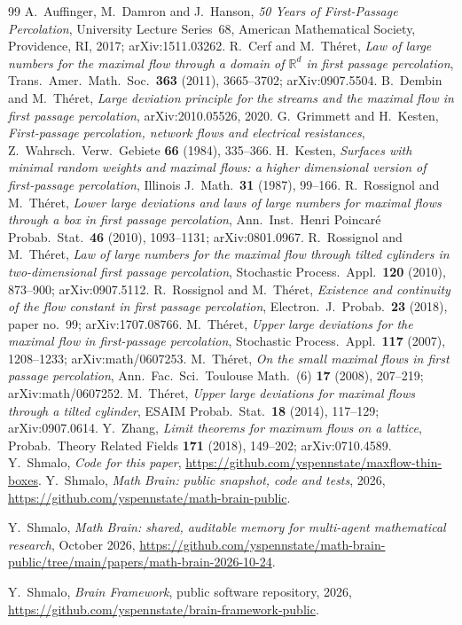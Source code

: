 \documentclass[11pt]{amsart}
\theoremstyle{definition}
\theoremstyle{remark}
\begin{document}
\begin{thebibliography}{99}
 A.~Auffinger, M.~Damron and J.~Hanson, \emph{50 Years of First-Passage Percolation}, University Lecture Series~68, American Mathematical Society, Providence, RI, 2017; arXiv:1511.03262.
 R.~Cerf and M.~Th\'eret, \emph{Law of large numbers for the maximal flow through a domain of $\mathbb{R}^d$ in first passage percolation}, Trans.\ Amer.\ Math.\ Soc.\ \textbf{363} (2011), 3665--3702; arXiv:0907.5504.
 B.~Dembin and M.~Th\'eret, \emph{Large deviation principle for the streams and the maximal flow in first passage percolation}, arXiv:2010.05526, 2020.
 G.~Grimmett and H.~Kesten, \emph{First-passage percolation, network flows and electrical resistances}, Z.\ Wahrsch.\ Verw.\ Gebiete \textbf{66} (1984), 335--366.
 H.~Kesten, \emph{Surfaces with minimal random weights and maximal flows: a higher dimensional version of first-passage percolation}, Illinois J.\ Math.\ \textbf{31} (1987), 99--166.
 R.~Rossignol and M.~Th\'eret, \emph{Lower large deviations and laws of large numbers for maximal flows through a box in first passage percolation}, Ann.\ Inst.\ Henri Poincar\'e Probab.\ Stat.\ \textbf{46} (2010), 1093--1131; arXiv:0801.0967.
 R.~Rossignol and M.~Th\'eret, \emph{Law of large numbers for the maximal flow through tilted cylinders in two-dimensional first passage percolation}, Stochastic Process.\ Appl.\ \textbf{120} (2010), 873--900; arXiv:0907.5112.
 R.~Rossignol and M.~Th\'eret, \emph{Existence and continuity of the flow constant in first passage percolation}, Electron.\ J.\ Probab.\ \textbf{23} (2018), paper no.~99; arXiv:1707.08766.
 M.~Th\'eret, \emph{Upper large deviations for the maximal flow in first-passage percolation}, Stochastic Process.\ Appl.\ \textbf{117} (2007), 1208--1233; arXiv:math/0607253.
 M.~Th\'eret, \emph{On the small maximal flows in first passage percolation}, Ann.\ Fac.\ Sci.\ Toulouse Math.\ (6) \textbf{17} (2008), 207--219; arXiv:math/0607252.
 M.~Th\'eret, \emph{Upper large deviations for maximal flows through a tilted cylinder}, ESAIM Probab.\ Stat.\ \textbf{18} (2014), 117--129; arXiv:0907.0614.
 Y.~Zhang, \emph{Limit theorems for maximum flows on a lattice}, Probab.\ Theory Related Fields \textbf{171} (2018), 149--202; arXiv:0710.4589.
 Y.~Shmalo, \emph{Code for this paper}, \url{https://github.com/yspennstate/maxflow-thin-boxes}.
 Y.~Shmalo, \emph{Math Brain: public snapshot, code and tests}, 2026, \url{https://github.com/yspennstate/math-brain-public}.

 Y.~Shmalo, \emph{Math Brain: shared, auditable memory for multi-agent mathematical research}, October 2026, \url{https://github.com/yspennstate/math-brain-public/tree/main/papers/math-brain-2026-10-24}.

 Y.~Shmalo, \emph{Brain Framework}, public software repository, 2026, \url{https://github.com/yspennstate/brain-framework-public}.

\end{thebibliography}
\end{document}
